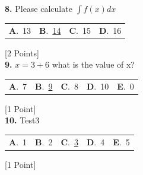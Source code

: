 \documentclass[12pt]{article}
\newcommand{\choice}[2]{\textbf{#1}.~#2}
\begin{document}
\noindent \textbf{\textenglish{8.}} {\textenglish{Please calculate }}\(\int f(x)dx\)

\begin{tabularx}{\linewidth}{@{}*{4}{Y}@{}}
\choice{A}{{{\textenglish{13}}}} & \choice{B}{{\underline{{\textenglish{14}}}}} & \choice{C}{{{\textenglish{15}}}} & \choice{D}{{{\textenglish{16}}}} \\
\end{tabularx}
\hfill {\textenglish{[2 Points]}}\\[0.5em]

\noindent \textbf{\textenglish{9.}} \(x=3+6 \){\textenglish{ what is the value of x?}}

\begin{tabularx}{\linewidth}{@{}*{5}{Y}@{}}
\choice{A}{{{\textenglish{7}}}} & \choice{B}{{\underline{{\textenglish{9}}}}} & \choice{C}{{{\textenglish{8}}}} & \choice{D}{{{\textenglish{10}}}} & \choice{E}{{{\textenglish{0}}}} \\
\end{tabularx}
\hfill {\textenglish{[1 Point]}}\\[0.5em]

\noindent \textbf{\textenglish{10.}} {\textenglish{Test3}}

\begin{tabularx}{\linewidth}{@{}*{5}{Y}@{}}
\choice{A}{{{\textenglish{1}}}} & \choice{B}{{{\textenglish{2}}}} & \choice{C}{{\underline{{\textenglish{3}}}}} & \choice{D}{{{\textenglish{4}}}} & \choice{E}{{{\textenglish{5}}}} \\
\end{tabularx}
\hfill {\textenglish{[1 Point]}}\\[0.5em]
\end{document}
